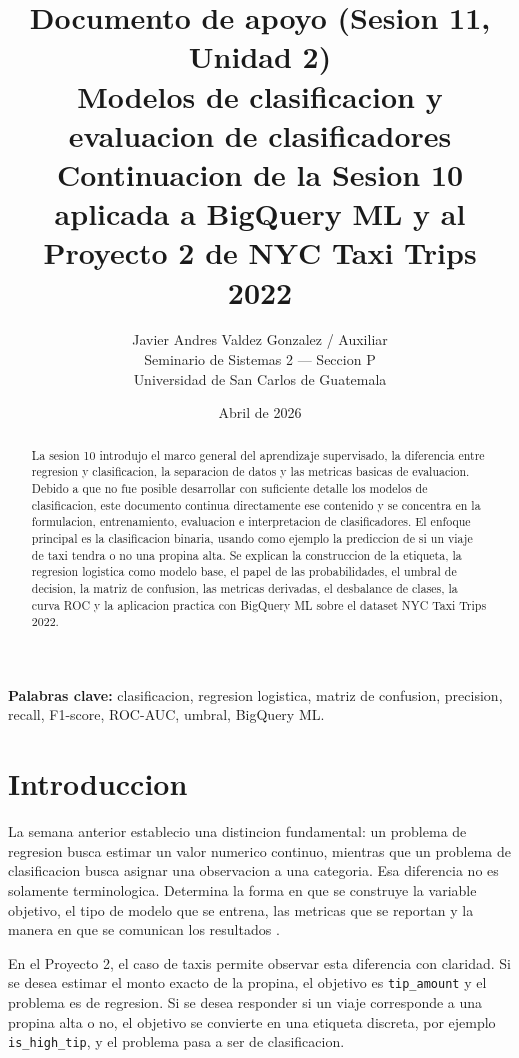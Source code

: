 \documentclass[12pt]{article}
\title{\textbf{Documento de apoyo (Sesion 11, Unidad 2)}\\
\large Modelos de clasificacion y evaluacion de clasificadores\\
\normalsize Continuacion de la Sesion 10 aplicada a BigQuery ML y al Proyecto 2 de NYC Taxi Trips 2022}
\author{Javier Andres Valdez Gonzalez / Auxiliar \\
\small Seminario de Sistemas 2 --- Seccion P \\
\small Universidad de San Carlos de Guatemala}
\date{Abril de 2026}
\begin{document}
\maketitle

\begin{abstract}
La sesion 10 introdujo el marco general del aprendizaje supervisado, la diferencia entre regresion y clasificacion, la separacion de datos y las metricas basicas de evaluacion. Debido a que no fue posible desarrollar con suficiente detalle los modelos de clasificacion, este documento continua directamente ese contenido y se concentra en la formulacion, entrenamiento, evaluacion e interpretacion de clasificadores. El enfoque principal es la clasificacion binaria, usando como ejemplo la prediccion de si un viaje de taxi tendra o no una propina alta. Se explican la construccion de la etiqueta, la regresion logistica como modelo base, el papel de las probabilidades, el umbral de decision, la matriz de confusion, las metricas derivadas, el desbalance de clases, la curva ROC y la aplicacion practica con BigQuery ML sobre el dataset NYC Taxi Trips 2022.
\end{abstract}

\textbf{Palabras clave:} clasificacion, regresion logistica, matriz de confusion, precision, recall, F1-score, ROC-AUC, umbral, BigQuery ML.

\newpage
\tableofcontents

\section{Introduccion}
La semana anterior establecio una distincion fundamental: un problema de regresion busca estimar un valor numerico continuo, mientras que un problema de clasificacion busca asignar una observacion a una categoria. Esa diferencia no es solamente terminologica. Determina la forma en que se construye la variable objetivo, el tipo de modelo que se entrena, las metricas que se reportan y la manera en que se comunican los resultados \cite{google_metrics_glossary}.

En el Proyecto 2, el caso de taxis permite observar esta diferencia con claridad. Si se desea estimar el monto exacto de la propina, el objetivo es \texttt{tip\_amount} y el problema es de regresion. Si se desea responder si un viaje corresponde a una propina alta o no, el objetivo se convierte en una etiqueta discreta, por ejemplo \texttt{is\_high\_tip}, y el problema pasa a ser de clasificacion.
\end{document}
